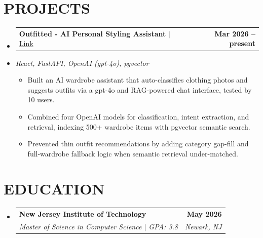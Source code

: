 \documentclass[letterpaper,11pt]{article}
\makeatletter
\newcommand{\resumeItem}[1]{
  \item\small{#1\vspace{-3pt}}
}
\newcommand{\resumeStack}[1]{
  \vspace{1pt}\item\small{\textit{#1}}\vspace{-6pt}
}
\newcommand{\resumeSubheading}[4]{
  \vspace{-3pt}\item
    \begin{tabular*}{1.0\textwidth}[t]{l@{\extracolsep{\fill}}r}
      \textbf{#1} & \textbf{\small #2} \\
      \textit{\small#3} & \textit{\small #4} \\
    \end{tabular*}\vspace{-9pt}
}
\newcommand{\resumeProjectHeading}[2]{
    \item
    \begin{tabular*}{1.001\textwidth}{l@{\extracolsep{\fill}}r}
      \small#1 & \textbf{\small #2}\\
    \end{tabular*}\vspace{-9pt}
}
\newcommand{\resumeItemListStart}{\begin{itemize}[leftmargin=0.15in, label=$\bullet$]}
\newcommand{\resumeItemListEnd}{\end{itemize}\vspace{-7pt}}
\newcommand{\resumeSubHeadingListStart}{\begin{itemize}[leftmargin=0.0in, label={}]}
\newcommand{\resumeSubHeadingListEnd}{\end{itemize}}
\makeatother
\begin{document}
\vspace{-3pt}
\section{PROJECTS}
\resumeSubHeadingListStart

\resumeProjectHeading
{\textbf{Outfitted - AI Personal Styling Assistant} $|$ \href{https://github.com/talaviyakhushi/outfitted}{Link}}{Mar 2026 -- present}
\vspace{-9pt}
\resumeStack{React, FastAPI, OpenAI (gpt-4o), pgvector}
\resumeItemListStart
  \resumeItem{Built an AI wardrobe assistant that auto-classifies clothing photos and suggests outfits via a gpt-4o and RAG-powered chat interface, tested by 10 users.}
  \resumeItem{Combined four OpenAI models for classification, intent extraction, and retrieval, indexing 500+ wardrobe items with pgvector semantic search.}
  \resumeItem{Prevented thin outfit recommendations by adding category gap-fill and full-wardrobe fallback logic when semantic retrieval under-matched.}
\resumeItemListEnd

\resumeSubHeadingListEnd
\vspace{-3pt}
\section{EDUCATION}
\vspace{1pt}
\resumeSubHeadingListStart
\vspace{5pt}
\resumeSubheading
{New Jersey Institute of Technology}{May 2026}
{Master of Science in Computer Science $|$ GPA: 3.8}{Newark, NJ}
\resumeSubHeadingListEnd
\end{document}
